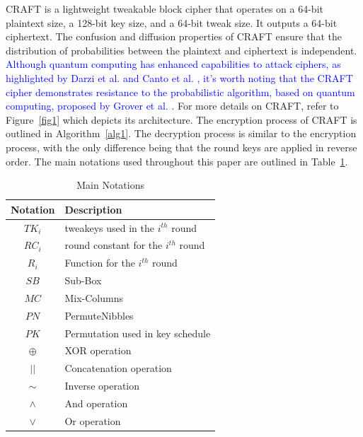 \documentclass[final,5p,times,twocolumn]{elsarticle}
\begin{document}
CRAFT is a lightweight tweakable block cipher that operates on a 64-bit plaintext size, a 128-bit key size, and a 64-bit tweak size.
It outputs a 64-bit ciphertext.
The confusion and diffusion properties of CRAFT ensure that the distribution of probabilities between the plaintext and ciphertext is independent.
\textcolor{blue}{Although quantum computing has enhanced capabilities to attack ciphers, as highlighted by Darzi et al. \cite{Darzi2023} and Canto et al. \cite{Canto2023a}, it's worth noting that the CRAFT cipher demonstrates resistance to the probabilistic algorithm, based on quantum computing, proposed by Grover et al. \cite{Grover1996}.}
For more details on CRAFT, refer to Figure~\ref{fig1} which depicts its architecture.
The encryption process of CRAFT is outlined in Algorithm~\ref{alg1}.
The decryption process is similar to the encryption process, with the only difference being that the round keys are applied in reverse order.
The main notations used throughout this paper are outlined in Table~\ref{tab1}.


\begin{table}[h]
    \centering
    \caption{Main Notations}\label{tab1}%
    \begin{tabular}{|c|l|}
        \hline
        Notation & Description                           \\
        \hline
        $TK_i$   & tweakeys used in the $i^{th}$ round   \\
        $RC_i$   & round constant for the $i^{th}$ round \\
        $R_i$    & Function for the $i^{th}$ round       \\
        $SB$     & Sub-Box                               \\
        $MC$     & Mix-Columns                           \\
        $PN$     & PermuteNibbles                        \\
        $PK$     & Permutation used in key schedule      \\
        $\oplus$ & XOR operation                         \\
        $||$     & Concatenation operation               \\
        $\sim$   & Inverse operation                     \\
        $\land$  & And operation                         \\
        $\lor$   & Or operation                          \\
        \hline
    \end{tabular}
\end{table}
\end{document}
